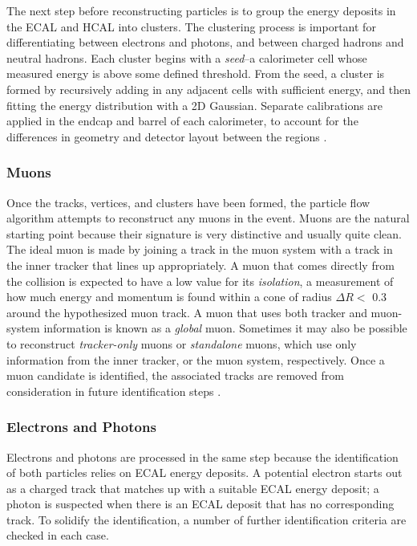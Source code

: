 The next step before reconstructing particles is to group the energy
deposits in the ECAL and HCAL into clusters. The clustering process
is important for differentiating between electrons and photons, and
between charged hadrons and neutral hadrons. Each cluster begins with
a \emph{seed}--a calorimeter cell whose measured energy is above some defined
threshold. From the seed, a cluster is formed by
recursively adding in any adjacent cells with sufficient energy, and
then fitting the energy distribution with a 2D Gaussian. Separate
calibrations are applied in the endcap and barrel of each calorimeter,
to account for the differences in geometry and detector layout between
the regions \cite{particleflow}.

\subsubsection{Muons}
\label{sssec:cms:pf:muons}

Once the tracks, vertices, and clusters have been formed, the particle
flow algorithm attempts to reconstruct any muons in the
event. Muons are the natural starting point because their signature is
very distinctive and usually quite clean. The ideal muon is made by joining a
track in the muon system with a track in the inner tracker that lines
up appropriately. A muon that comes directly from the collision is expected
to have a low value for its \emph{isolation}, a measurement of how
much energy and momentum is found within a cone of radius $\Delta R <$
0.3 around the hypothesized muon track. A muon
that uses both tracker and muon-system information is known as a
\emph{global} muon. Sometimes it may also be possible to reconstruct
\emph{tracker-only} muons or \emph{standalone} muons, which use only
information from the inner tracker, or the muon system,
respectively. Once a muon candidate is identified, the associated
tracks are removed from consideration in future identification
steps \cite{particleflow}.

\subsubsection{Electrons and Photons}
\label{sssec:cms:pf:egamma}

Electrons and photons are processed in the same step because the
identification of both particles relies on ECAL energy deposits. A
potential electron starts out as a charged track that matches up with
a suitable ECAL energy deposit; a photon is suspected when there
is an ECAL deposit that has no corresponding track. To solidify the
identification, a number of further identification criteria are
checked in each case.

